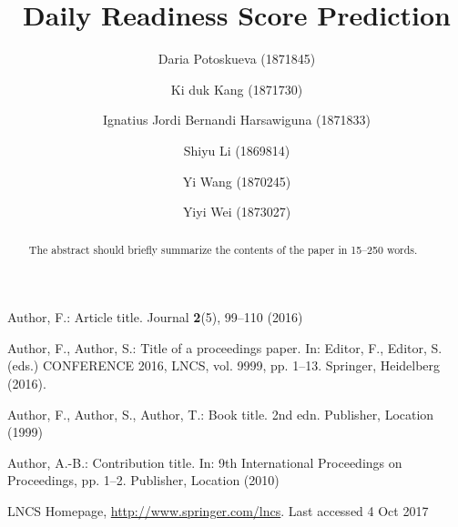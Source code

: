\documentclass[runningheads]{llncs}
\begin{document}
%
\title{Daily Readiness Score Prediction}
%

\author{Daria Potoskueva (1871845)
\and Ki duk Kang (1871730)
\and
Ignatius Jordi Bernandi Harsawiguna (1871833)
\and
Shiyu Li (1869814)
\and
Yi Wang (1870245)
\and
Yiyi Wei (1873027)}
%
%
\maketitle              %
%
\begin{abstract}
The abstract should briefly summarize the contents of the paper in
15--250 words.

\end{abstract}
%











%
%
% 
% 
%
\begin{thebibliography}{8}
Author, F.: Article title. Journal \textbf{2}(5), 99--110 (2016)

Author, F., Author, S.: Title of a proceedings paper. In: Editor,
F., Editor, S. (eds.) CONFERENCE 2016, LNCS, vol. 9999, pp. 1--13.
Springer, Heidelberg (2016). 

Author, F., Author, S., Author, T.: Book title. 2nd edn. Publisher,
Location (1999)

Author, A.-B.: Contribution title. In: 9th International Proceedings
on Proceedings, pp. 1--2. Publisher, Location (2010)

LNCS Homepage, \url{http://www.springer.com/lncs}. Last accessed 4
Oct 2017
\end{thebibliography}
\end{document}
